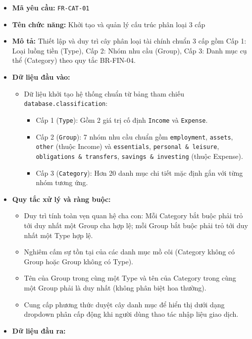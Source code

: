 \documentclass[11pt,a4paper]{article}
\providecommand{\tightlist}{
  \setlength{\itemsep}{0pt}\setlength{\parskip}{0pt}}
\begin{document}
\begin{itemize}
\tightlist
\item
  \textbf{Mã yêu cầu:} \texttt{FR-CAT-01}
\item
  \textbf{Tên chức năng:} Khởi tạo và quản lý cấu trúc phân loại 3 cấp
\item
  \textbf{Mô tả:} Thiết lập và duy trì cây phân loại tài chính chuẩn 3
  cấp gồm Cấp 1: Loại luồng tiền (Type), Cấp 2: Nhóm nhu cầu (Group),
  Cấp 3: Danh mục cụ thể (Category) theo quy tắc BR-FIN-04.
\item
  \textbf{Dữ liệu đầu vào:}

  \begin{itemize}
  \tightlist
  \item
    Dữ liệu khởi tạo hệ thống chuẩn từ bảng tham chiếu
    \texttt{database.classification}:

    \begin{itemize}
    \tightlist
    \item
      Cấp 1 (\texttt{Type}): Gồm 2 giá trị cố định \texttt{Income} và
      \texttt{Expense}.
    \item
      Cấp 2 (\texttt{Group}): 7 nhóm nhu cầu chuẩn gồm
      \texttt{employment}, \texttt{assets}, \texttt{other} (thuộc
      Income) và \texttt{essentials}, \texttt{personal\ \&\ leisure},
      \texttt{obligations\ \&\ transfers},
      \texttt{savings\ \&\ investing} (thuộc Expense).
    \item
      Cấp 3 (\texttt{Category}): Hơn 20 danh mục chi tiết mặc định gắn
      với từng nhóm tương ứng.
    \end{itemize}
  \end{itemize}
\item
  \textbf{Quy tắc xử lý và ràng buộc:}

  \begin{itemize}
  \tightlist
  \item
    Duy trì tính toàn vẹn quan hệ cha con: Mỗi Category bắt buộc phải
    trỏ tới duy nhất một Group cha hợp lệ; mỗi Group bắt buộc phải trỏ
    tới duy nhất một Type hợp lệ.
  \item
    Nghiêm cấm sự tồn tại của các danh mục mồ côi (Category không có
    Group hoặc Group không có Type).
  \item
    Tên của Group trong cùng một Type và tên của Category trong cùng một
    Group phải là duy nhất (không phân biệt hoa thường).
  \item
    Cung cấp phương thức duyệt cây danh mục để hiển thị dưới dạng
    dropdown phân cấp động khi người dùng thao tác nhập liệu giao dịch.
  \end{itemize}
\item
  \textbf{Dữ liệu đầu ra:}


\end{itemize}
\end{document}
